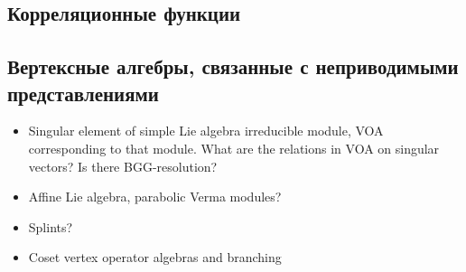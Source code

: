 \documentclass[12pt]{article}
\begin{document}
\subsection{Корреляционные функции}
\label{sec:correlation-functions}

\subsection{Вертексные алгебры, связанные с неприводимыми представлениями}
\label{sec:voa-irreps}



\begin{itemize}
\item Singular element of simple Lie algebra irreducible module, VOA corresponding to that module.
  What are the relations in VOA on singular vectors? Is there BGG-resolution?
\item Affine Lie algebra, parabolic Verma modules?
\item Splints?
\item Coset vertex operator algebras and branching
\end{itemize}

{}

\end{document}
